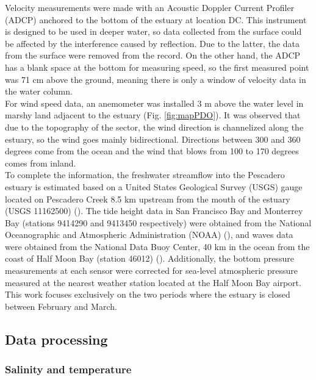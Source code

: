 \documentclass[11pt,letterpaper]{article}
\begin{document}
Velocity measurements were made with an Acoustic Doppler Current Profiler (ADCP) anchored to the bottom of the estuary at location DC. This instrument is designed to be used in deeper water, so data collected from the surface could be affected by the interference caused by reflection. Due to the latter, the data from the surface were removed from the record. On the other hand, the ADCP has a blank space at the bottom for measuring speed, so the first measured point was 71 cm above the ground, meaning there is only a window of velocity data in the water column. \\

For wind speed data, an anemometer was installed 3 m above the water level in marshy land adjacent to the estuary (Fig. \ref{fig:mapPDO}). It was observed that due to the topography of the sector, the wind direction is channelized along the estuary, so the wind goes mainly bidirectional. Directions between 300 and 360 degrees come from the ocean and the wind that blows from 100 to 170 degrees comes from inland.\\

To complete the information, the freshwater streamflow into the Pescadero estuary is estimated based on a United States Geological Survey (USGS) gauge located on Pescadero Creek 8.5 km upstream from the mouth of the estuary (USGS 11162500) (\cite{usgs2022discharge}). The tide height data in San Francisco Bay and Monterrey Bay (stations 9414290 and 9413450 respectively) were obtained from the National Oceanographic and Atmospheric Administration (NOAA) (\cite{noaa2022sftides, noaa2022mntytides}), and waves data were obtained from the National Data Buoy Center, 40 km in the ocean from the coast of Half Moon Bay (station 46012) (\cite{noaa2022waves}). Additionally, the bottom pressure measurements at each sensor were corrected for sea-level atmospheric pressure measured at the nearest weather station located at the Half Moon Bay airport. This work focuses exclusively on the two periods where the estuary is closed between February and March.\\

\subsection{Data processing}

\subsubsection{Salinity and temperature}
\end{document}
